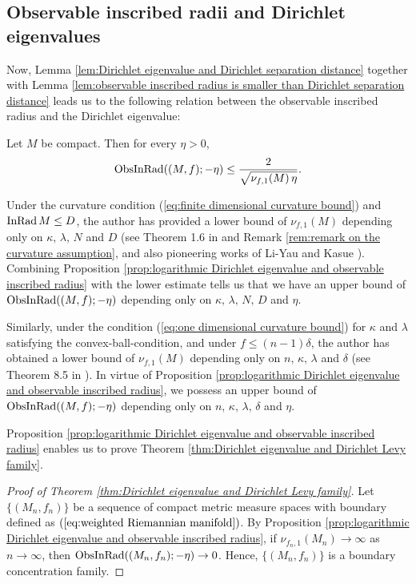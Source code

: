 \subsection{Observable inscribed radii and Dirichlet eigenvalues}
Now,
Lemma \ref{lem:Dirichlet eigenvalue and Dirichlet separation distance} together with Lemma \ref{lem:observable inscribed radius is smaller than Dirichlet separation distance}
leads us to the following relation between the observable inscribed radius and the Dirichlet eigenvalue:
\begin{prop}\label{prop:logarithmic Dirichlet eigenvalue and observable inscribed radius}
Let $M$ be compact.
Then for every $\eta>0$,
\begin{equation*}
\operatorname{ObsInRad}((M,f);-\eta)\leq \frac{2}{\sqrt{\nu_{f,1}(M)\, \eta}}.
\end{equation*}
\end{prop}

\begin{rem}
Under the curvature condition (\ref{eq:finite dimensional curvature bound}) and $\operatorname{InRad} M \leq D$,
the author \cite{S1} has provided a lower bound of $\nu_{f,1}(M)$ depending only on $\kappa,\,\lambda,\,N$ and $D$ (see Theorem 1.6 in \cite{S1} and Remark \ref{rem:remark on the curvature assumption},
and also pioneering works of Li-Yau \cite{LY} and Kasue \cite{K2}).
Combining Proposition \ref{prop:logarithmic Dirichlet eigenvalue and observable inscribed radius} with the lower estimate tells us that
we have an upper bound of $\operatorname{ObsInRad}((M,f);-\eta)$ depending only on $\kappa,\,\lambda,\,N,\,D$ and $\eta$.

Similarly,
under the condition (\ref{eq:one dimensional curvature bound}) for $\kappa$ and $\lambda$ satisfying the convex-ball-condition,
and under $f\leq (n-1)\delta$,
the author \cite{S2} has obtained a lower bound of $\nu_{f,1}(M)$ depending only on $n,\,\kappa,\,\lambda$ and $\delta$ (see Theorem 8.5 in \cite{S2}).
In virtue of Proposition \ref{prop:logarithmic Dirichlet eigenvalue and observable inscribed radius},
we possess an upper bound of $\operatorname{ObsInRad}((M,f);-\eta)$ depending only on $n,\,\kappa,\,\lambda,\,\delta$ and $\eta$.
\end{rem}

Proposition \ref{prop:logarithmic Dirichlet eigenvalue and observable inscribed radius} enables us to prove Theorem \ref{thm:Dirichlet eigenvalue and Dirichlet Levy family}.
\begin{proof}[Proof of Theorem \ref{thm:Dirichlet eigenvalue and Dirichlet Levy family}]
Let $\{(M_{n},f_{n})\}$ be a sequence of compact metric measure spaces with boundary defined as $(\ref{eq:weighted Riemannian manifold})$.
By Proposition \ref{prop:logarithmic Dirichlet eigenvalue and observable inscribed radius},
if $\nu_{f_{n},1}(M_{n})\to \infty$ as $n\to \infty$,
then $\operatorname{ObsInRad}((M_{n},f_{n});-\eta)\to 0$.
Hence,
$\{(M_{n},f_{n})\}$ is a boundary concentration family.
\end{proof}

